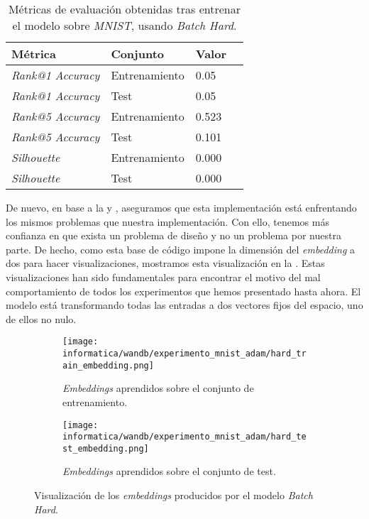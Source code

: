 \begin{table}[!hbtp]
\centering
\begin{tabular}{|l|l|l|l|}
    \hline
    Métrica & Conjunto & Valor \\
    \hline

    \textit{Rank@1 Accuracy} & Entrenamiento & 0.05 \\
    \textit{Rank@1 Accuracy} & Test & 0.05  \\
    \textit{Rank@5 Accuracy} & Entrenamiento & 0.523  \\
    \textit{Rank@5 Accuracy} & Test & 0.101 \\
    \textit{Silhouette} & Entrenamiento & 0.000 \\
    \textit{Silhouette} & Test & 0.000 \\
    \hline

\end{tabular}
\caption{Métricas de evaluación obtenidas tras entrenar el modelo sobre \textit{MNIST}, usando \textit{Batch Hard}.}
    \label{table:resultados_adam_mnist}
\end{table}

De nuevo, en base a la  y , aseguramos que esta implementación está enfrentando los mismos problemas que nuestra implementación. Con ello, tenemos más confianza en que exista un problema de diseño y no un problema por nuestra parte. De hecho, como esta base de código impone la dimensión del \textit{embedding} a dos para hacer visualizaciones, mostramos esta visualización en la . Estas visualizaciones han sido fundamentales para encontrar el motivo del mal comportamiento de todos los experimentos que hemos presentado hasta ahora. El modelo está transformando todas las entradas a dos vectores fijos del espacio, uno de ellos no nulo.

\begin{figure}
\ajustarsubcaptions
\centering
    \begin{subfigure}{.5\textwidth}
        \centering
        \texttt{[image: informatica/wandb/experimento\_mnist\_adam/hard\_train\_embedding.png]}
        \caption{\textit{Embeddings} aprendidos sobre el conjunto de entrenamiento.}
    \end{subfigure}%
    \begin{subfigure}{.5\textwidth}
        \centering
        \texttt{[image: informatica/wandb/experimento\_mnist\_adam/hard\_test\_embedding.png]}
        \caption{\textit{Embeddings} aprendidos sobre el conjunto de test.}
    \end{subfigure}
\caption{Visualización de los \textit{embeddings} producidos por el modelo \textit{Batch Hard}. }
\label{img:train_hard_embeddings}
\end{figure}


